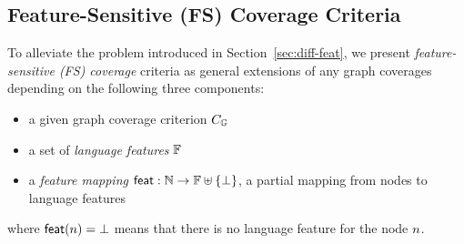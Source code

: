 

\subsection{Feature-Sensitive (FS) Coverage Criteria}\label{sec:fs-cov}

To alleviate the problem introduced in Section~\ref{sec:diff-feat}, we present
\textit{feature-sensitive (FS) coverage} criteria as general extensions of any
graph coverages depending on the following three components:
%
\begin{itemize}
  \item a given graph coverage criterion $C_{\mathbb{G}}$
  \item a set of \textit{language features} $\mathbb{F}$
  \item a \textit{feature mapping} $\textsf{feat}: \mathbb{N} \rightarrow \mathbb{F}
    \uplus \{ \bot \}$, a partial mapping from nodes to language features
\end{itemize}
%
where $\textsf{feat}(n) = \bot$ means that there is no language feature for the
node $n$.


